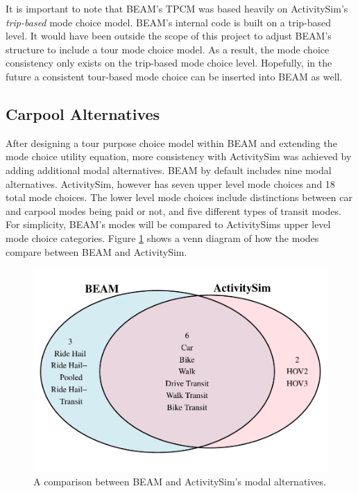 \documentclass[12pt, oneside, openright]{byuthesis}
\begin{document}
It is important to note that BEAM's TPCM was based heavily on ActivitySim's \emph{trip-based} mode choice model. BEAM's internal code is built on a trip-based level. It would have been outside the scope of this project to adjust BEAM's structure to include a tour mode choice model. As a result, the mode choice consistency only exists on the trip-based mode choice level. Hopefully, in the future a consistent tour-based mode choice can be inserted into BEAM as well.

\hypertarget{pool}{%
\subsection{Carpool Alternatives}\label{pool}}

After designing a tour purpose choice model within BEAM and extending the mode choice utility equation, more consistency with ActivitySim was achieved by adding additional modal alternatives. BEAM by default includes nine modal alternatives. ActivitySim, however has seven upper level mode choices and 18 total mode choices. The lower level mode choices include distinctions between car and carpool modes being paid or not, and five different types of transit modes. For simplicity, BEAM's modes will be compared to ActivitySims upper level mode choice categories. Figure \ref{fig:venn} shows a venn diagram of how the modes compare between BEAM and ActivitySim.

\begin{figure}

{\centering \includegraphics{thesis_files/figure-latex/venn-1} 

}

\caption{A comparison between BEAM and ActivitySim's modal alternatives.}\label{fig:venn}
\end{figure}
\end{document}
